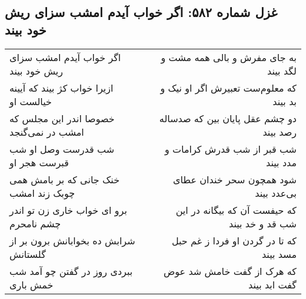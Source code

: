 \begin{center}
\section*{غزل شماره ۵۸۲: اگر خواب آیدم امشب سزای ریش خود بیند}
\label{sec:0582}
\begin{longtable}{l p{0.5cm} r}
اگر خواب آیدم امشب سزای ریش خود بیند
&&
به جای مفرش و بالی همه مشت و لگد بیند
\\
ازیرا خواب کژ بیند که آیینه خیالست او
&&
که معلوم‌ست تعبیرش اگر او نیک و بد بیند
\\
خصوصا اندر این مجلس که امشب در نمی‌گنجد
&&
دو چشم عقل پایان بین که صدساله رصد بیند
\\
شب قدرست وصل او شب قبرست هجر او
&&
شب قبر از شب قدرش کرامات و مدد بیند
\\
خنک جانی که بر بامش همی چوبک زند امشب
&&
شود همچون سحر خندان عطای بی‌عدد بیند
\\
برو ای خواب خاری زن تو اندر چشم نامحرم
&&
که حیفست آن که بیگانه در این شب قد و خد بیند
\\
شرابش ده بخوابانش برون بر از گلستانش
&&
که تا در گردن او فردا ز غم حبل مسد بیند
\\
ببردی روز در گفتن چو آمد شب خمش باری
&&
که هرک از گفت خامش شد عوض گفت ابد بیند
\\
\end{longtable}
\end{center}
